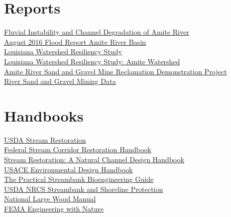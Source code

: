 \documentclass[11pt,article,oneside]{memoir}
\begin{document}
\clearpage

\section{Reports}
%
\href{http://www.dtic.mil/dtic/tr/fulltext/u2/a471731.pdf}{Fluvial Instability and Channel Degradation of Amite River} \\
%
\href{http://www.amitebasin.org/2016Flood/August\%202016\%20Flood\%20Preliminary\%20Report.pdf}{August 2016 Flood Report Amite River Basin} \\
%
\href{https://data.femadata.com/Region6/mitigation/riskmap/lawrs/reports/LaWRS_Main\%20Report.pdf}{Louisiana Watershed Resiliency Study} \\
%
\href{https://data.femadata.com/Region6/mitigation/riskmap/lawrs/reports/Amite_Appendix.pdf}{Louisiana Watershed Resiliency Study: Amite Watershed} \\
%
\href{http://www.mvn.usace.army.mil/Portals/56/docs/PD/Projects/AmiteEcoSys/DEQ.pdf}{Amite River Sand and Gravel Mine Reclamation Demonstration Project} \\
%
\href{https://minerals.usgs.gov/mrerp/reports/Mossa-04HQGR0178/Mossa_Report1-04HQGR0178.pdf}{River Sand and Gravel Mining Data} \\

\section{Handbooks}
%
\href{http://go.usa.gov/BvNA}{USDA Stream Restoration} \\
%
\href{https://www.nrcs.usda.gov/wps/portal/nrcs/detailfull/national/water/manage/restoration/?cid=stelprdb1043244}{Federal Stream Corridor Restoration Handbook} \\
%
\href{https://semspub.epa.gov/work/01/554360.pdf}{Stream Restoration: A Natural Channel Design Handbook} \\
%
\href{http://www.mvr.usace.army.mil/Portals/48/docs/Environmental/EMP/HREP/EMP_Documents/2012\%20UMRR\%20EMP\%20Environmental\%20Design\%20Handbook\%20-\%20FINAL.pdf}{USACE Environmental Design Handbook} \\
%
\href{https://www.nrcs.usda.gov/Internet/FSE_PLANTMATERIALS/publications/idpmcpu116.pdf}{The Practical Streambank Bioengineering Guide} \\
%
\href{https://efotg.sc.egov.usda.gov/references/public/IA/Chapter-16_Streambank_and_Shoreline_Protection.pdf}{USDA NRCS Streambank and Shoreline Protection} \\
%
\href{https://coloradoewp.com/sites/coloradoewp.com/files/document/pdf/2016\%20National\%20Large\%20Wood\%20Manual.pdf}{National Large Wood Manual} \\
%
\href{https://www.fema.gov/pdf/about/regions/regionx/Engineering_With_Nature_Web.pdf}{FEMA Engineering with Nature} \\
\end{document}
